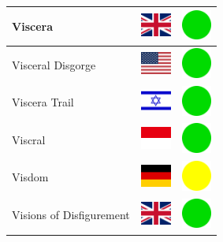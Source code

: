 \documentclass[12pt, a4paper, twoside]{report}
\begin{document}
\begin{center}
\begin{longtable}{|p{5cm}|p{2cm}|p{2cm}|}
 Viscera                                                    & \includegraphics[width=1cm]{../img/flags/gb} &   \includegraphics[width=1cm]{../likes/y} \\ \hline
 Visceral Disgorge                                          & \includegraphics[width=1cm]{../img/flags/us} &   \includegraphics[width=1cm]{../likes/y} \\ \hline
 Viscera Trail                                              & \includegraphics[width=1cm]{../img/flags/il} &   \includegraphics[width=1cm]{../likes/y} \\ \hline
 Viscral                                                    & \includegraphics[width=1cm]{../img/flags/id} &   \includegraphics[width=1cm]{../likes/y} \\ \hline
 Visdom                                                     & \includegraphics[width=1cm]{../img/flags/de} &   \includegraphics[width=1cm]{../likes/m} \\ \hline
 Visions of Disfigurement                                   & \includegraphics[width=1cm]{../img/flags/gb} &   \includegraphics[width=1cm]{../likes/y} \\ \hline

\end{longtable}
\end{center}
\end{document}
